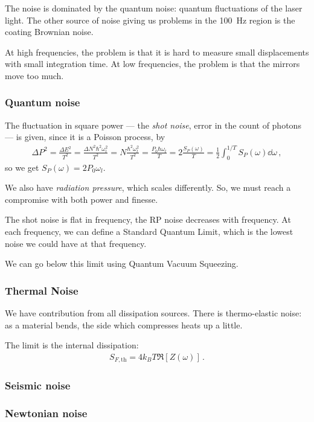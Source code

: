 \documentclass[main.tex]{subfiles}
\begin{document}
The noise is dominated by the quantum noise: quantum fluctuations of the laser light. 
The other source of noise giving us problems in the \SI{100}{Hz} region is the coating Brownian noise. 

At high frequencies, the problem is that it is hard to measure small displacements with small integration time. 
At low frequencies, the problem is that the mirrors move too much. 

\subsubsection{Quantum noise}

The fluctuation in square power --- the \emph{shot noise}, error in the count of photons ---  is given, since it is a Poisson process, by
%
\begin{align}
\Delta P^2 = \frac{\Delta E^2}{T^2} = 
\frac{\Delta N^2 \hbar^2 \omega_{l}^2}{T^2}
= N \frac{\hbar^2   \omega_{l}^2}{T^2}
= \frac{P_0 \hbar \omega_{l}}{T}
= 2\frac{S_P(\omega )}{T}
= \frac{1}{2} \int_{0}^{1/T} S_P (\omega) \dd{\omega }
\,,
\end{align}
%
so we get \(S_P (\omega ) = 2 P_0 \omega_{l}\). 

We also have \emph{radiation pressure}, which scales differently. 
So, we must reach a compromise with both power and finesse. 

The shot noise is flat in frequency, the RP noise decreases with frequency. 
At each frequency, we can define a Standard Quantum Limit, which is the lowest noise we could have at that frequency. 

We can go below this limit using Quantum Vacuum Squeezing. 

\subsubsection{Thermal Noise}

We have contribution from all dissipation sources. 
There is thermo-elastic noise: as a material bends, the side which compresses heats up a little. 

The limit is the internal dissipation: 
%
\begin{align}
S_{F, \text{th}} = 4 k_B T \Re[Z(\omega )]  
\,.
\end{align}

\subsubsection{Seismic noise}

\subsubsection{Newtonian noise}
\end{document}
